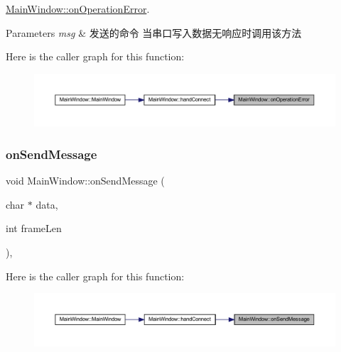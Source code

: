 \mbox{\hyperlink{class_main_window_afa5d14c3c19a3ce9a57a63f32d7b6af5}{Main\+Window\+::on\+Operation\+Error}}. 


\begin{DoxyParams}{Parameters}
{\em msg} & 发送的命令 当串口写入数据无响应时调用该方法 \\
\hline
\end{DoxyParams}
Here is the caller graph for this function\+:
\nopagebreak
\begin{figure}[H]
\begin{center}
\leavevmode
\includegraphics[width=350pt]{class_main_window_afa5d14c3c19a3ce9a57a63f32d7b6af5_icgraph}
\end{center}
\end{figure}
\mbox{\label{class_main_window_a18b22ec92e72eb11a50503f30dbc756d}} 
\subsubsection{\texorpdfstring{onSendMessage}{onSendMessage}}
{\footnotesize\ttfamily void Main\+Window\+::on\+Send\+Message (\begin{DoxyParamCaption}\item[{char $\ast$}]{data,  }\item[{int}]{frame\+Len }\end{DoxyParamCaption})\hspace{0.3cm}{\ttfamily [private]}, {\ttfamily [slot]}}

Here is the caller graph for this function\+:
\nopagebreak
\begin{figure}[H]
\begin{center}
\leavevmode
\includegraphics[width=350pt]{class_main_window_a18b22ec92e72eb11a50503f30dbc756d_icgraph}
\end{center}
\end{figure}
\mbox{\label{class_main_window_acfa568cdc9d07d4a8cc9e1eda8fee0e1}} 

